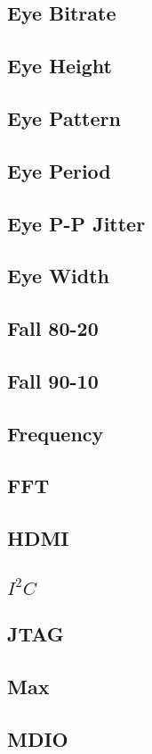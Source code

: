 \subsection{Eye Bitrate}
\subsection{Eye Height}
\subsection{Eye Pattern}
\subsection{Eye Period}
\subsection{Eye P-P Jitter}
\subsection{Eye Width}
\subsection{Fall 80-20}
\subsection{Fall 90-10}
\subsection{Frequency}
\subsection{FFT}
\subsection{HDMI}
\label{filter:hdmi}
\subsection{$I^2C$}
\subsection{JTAG}
\subsection{Max}
\subsection{MDIO}
